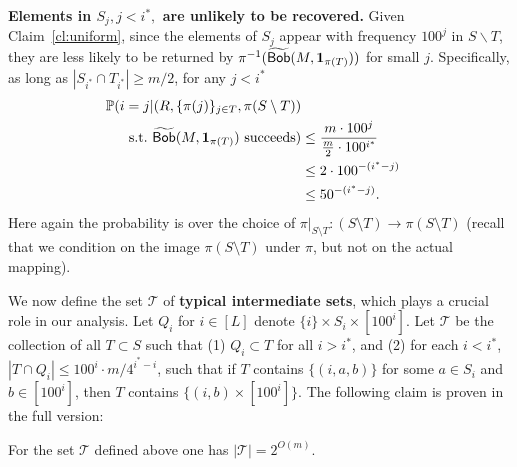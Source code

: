 \textbf{Elements in $S_{j}, j<i^*,$ are unlikely to be recovered.} Given Claim~\ref{cl:uniform}, since the elements of $S_j$ appear with frequency $100^j$ in $S\backslash T$, they are less likely to be returned by $\pi^{-1}(\widetilde{\mathsf{Bob}}(M, \mathbf{1}_{\pi(T)}))$ for small $j$.  Specifically, as long as $|S_{i^*}\cap T_{i^*}|\geq m/2$, for any $j< i^*$
\begin{equation}
\begin{split}
 \Pr(i = j | (R, \{\pi(j)\}_{j\in T}, \pi(S\setminus T)) \\ \text{~s.t.~}\widetilde{\query}(M, \mathbf{1}_{\pi(T)})\text{~succeeds})& \le \frac{m\cdot 100^j}{\frac m2\cdot 100^{i^*}}\\
& \le 2\cdot 100^{-(i^*-j)} \\
&\le 50^{-(i^*-j)} . \label{eqn:others-unlikely}
\end{split}
\end{equation}
Here again the probability is over the choice of $\pi|_{S\setminus T}:(S\setminus T)\to \pi(S\setminus T)$ (recall that we condition on the image $\pi(S\setminus T)$ under $\pi$, but not on the actual mapping).

We now define the set $\mathcal{T}$ of {\bf typical intermediate sets}, which plays a crucial role in our analysis.  Let $Q_i$ for $i\in [L]$ denote $\{i\} \times S_i \times [100^i]$. Let $\mathcal{T}$ be the collection of all $T\subset S$ such that (1) $Q_i\subset T$ for all $i>i^*$, and (2) for each $i < i^*$, $|T\cap Q_i| \le 100^i\cdot  m/4^{i^*-i}$, such that if $T$ contains $\{(i, a, b)\}$ for some $a\in S_i$ and $b\in [100^i]$, then $T$ contains $\{(i, b)\times [100^i]\}$.  The following claim is proven in the full version:
\begin{claim}\label{cl:size-of-t}
For the set $\mathcal{T}$ defined above one has $|\mathcal{T}|=2^{O(m)}$.
\end{claim}


